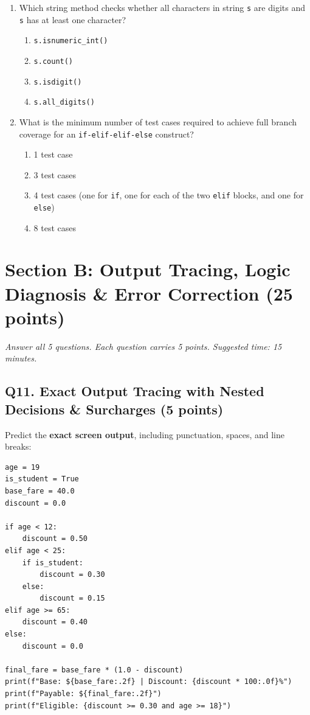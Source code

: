 \documentclass[11pt,a4paper]{article}
\begin{document}
\begin{enumerate}[label=\textbf{Q\arabic*.},leftmargin=2em,itemsep=1.5pt,topsep=1pt,resume]
\item Which string method checks whether all characters in string \texttt{s} are digits and \texttt{s} has at least one character?
\begin{enumerate}[label=\Alph*.,leftmargin=2em]
  \item \texttt{s.isnumeric\_int()}
  \item \texttt{s.count()}
  \item \texttt{s.isdigit()}
  \item \texttt{s.all\_digits()}
\end{enumerate}

\item What is the minimum number of test cases required to achieve full branch coverage for an \texttt{if-elif-elif-else} construct?
\begin{enumerate}[label=\Alph*.,leftmargin=2em]
  \item 1 test case
  \item 3 test cases
  \item 4 test cases (one for \texttt{if}, one for each of the two \texttt{elif} blocks, and one for \texttt{else})
  \item 8 test cases
\end{enumerate}

\end{enumerate}

\section*{Section B: Output Tracing, Logic Diagnosis \& Error Correction \hfill \normalsize\normalfont(25 points)}
\textit{Answer all 5 questions. Each question carries 5 points. Suggested time: 15 minutes.}

\subsection*{Q11. Exact Output Tracing with Nested Decisions \& Surcharges (5 points)}
Predict the \textbf{exact screen output}, including punctuation, spaces, and line breaks:

\begin{lstlisting}
age = 19
is_student = True
base_fare = 40.0
discount = 0.0

if age < 12:
    discount = 0.50
elif age < 25:
    if is_student:
        discount = 0.30
    else:
        discount = 0.15
elif age >= 65:
    discount = 0.40
else:
    discount = 0.0

final_fare = base_fare * (1.0 - discount)
print(f"Base: ${base_fare:.2f} | Discount: {discount * 100:.0f}%")
print(f"Payable: ${final_fare:.2f}")
print(f"Eligible: {discount >= 0.30 and age >= 18}")
\end{lstlisting}
\end{document}
